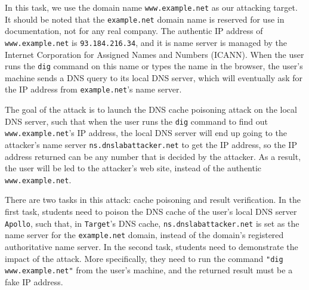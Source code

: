 

In this task, we use the domain name {\tt www.example.net}
as our attacking target. It should be noted that the {\tt example.net} 
domain name is reserved for use in documentation, not for 
any real company. The authentic IP address of {\tt www.example.net} is 
{\tt 93.184.216.34}, and it is name server is managed by
the Internet Corporation for Assigned Names and Numbers (ICANN).
When the user runs the {\tt dig} command 
on this name or types the name in the browser, 
the user's machine sends a DNS query to its local DNS 
server, which will eventually ask for the IP address 
from {\tt example.net}'s name server. 


The goal of the attack is to launch the DNS cache poisoning attack
on the local DNS server, such that 
when the user runs the {\tt dig} command to find out {\tt
www.example.net}'s IP address, the local DNS server will end
up going to the attacker's name server {\tt ns.dnslabattacker.net} 
to get the IP address, so the IP address returned can be 
any number that is decided by the attacker. As a result, the 
user will be led to the attacker's web site,
instead of the authentic {\tt www.example.net}.



There are two tasks in this attack: cache poisoning and result
verification.  In the first task, 
students need to poison the DNS cache of the user's local DNS server {\tt
Apollo}, such that, in {\tt Target}'s DNS cache,
{\tt ns.dnslabattacker.net} is set as the name server for 
the {\tt example.net} domain, instead of the domain's 
registered authoritative name server. 
In the second task, students need to demonstrate the impact of the attack.
More specifically, they need to run the command {\tt "dig
www.example.net"} from the user's machine, and the returned 
result must be a fake IP address. 




